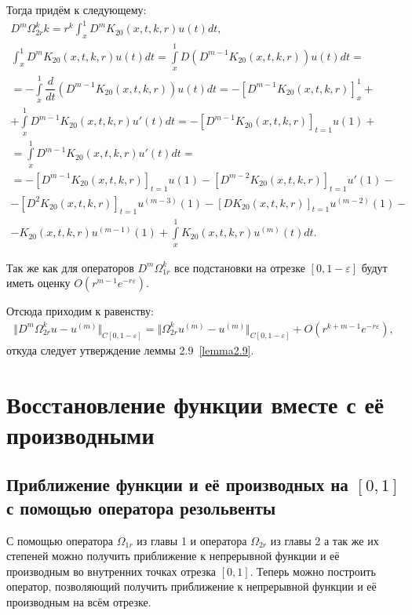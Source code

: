 Тогда придём к следующему:
\begin{equation}
\begin{array}{c}
\nonumber

D^m\Omega_{2r}^kk = r^k \int_x^1 D^m K_{20}(x,t,k,r)u(t)dt, \\
\int_x^1 D^mK_{20}(x,t,k,r)u(t)dt = \int\limits_x^1 D(D^{m-1}K_{20}(x,t,k,r))u(t)dt = \\
= - \int\limits_x^1 \dfrac{d}{dt}(D^{m-1}K_{20}(x,t,k,r))u(t)dt = - [D^{m-1}K_{20}(x,t,k,r)]_x^1 + \\ + \int\limits_x^1 D^{m-1}K_{20}(x,t,k,r)u'(t)dt = -[D^{m-1}K_{20}(x,t,k,r)]_{t=1}u(1) + \\ = \int\limits_x^1 D^{m-1}K_{20}(x,t,k,r)u'(t)dt = \\
= -[D^{m-1}K_{20}(x,t,k,r)]_{t=1}u(1) - [D^{m-2}K_{20}(x,t,k,r)]_{t=1}u'(1) - \\ - [D^2K_{20}(x,t,k,r)]_{t=1}u^{(m-3)}(1) - [DK_{20}(x,t,k,r)]_{t=1}u^{(m-2)}(1) - \\ - K_{20}(x,t,k,r)u^{(m-1)}(1) + \int\limits_x^1 K_{20}(x,t,k,r)u^{(m)}(t)dt.

\end{array}
\end{equation}

Так же как для операторов $ D^m\Omega_{1r}^k $ все подстановки на отрезке $ [0,1-\varepsilon] $ будут иметь оценку $ O(r^{m-1}e^{-r\varepsilon}) $.

Отсюда приходим к равенству:
\begin{equation}
\begin{array}{c}
\nonumber

\Vert D^m\Omega_{2r}^ku - u^{(m)} \Vert_{C[0,1-\varepsilon]} = \Vert \Omega_{2r}^ku^{(m)} - u^{(m)} \Vert_{C[0,1-\varepsilon]} + O(r^{k+m-1}e^{-r\varepsilon}),

\end{array}
\end{equation}
откуда следует утверждение леммы 2.9~\eqref{lemma2.9}.

\chapter{Восстановление функции вместе с её производными}
\section{Приближение функции и её производных на $ [0,1] $ с помощью оператора резольвенты}
С помощью оператора $ \Omega_{1r} $ из главы 1 и оператора $ \Omega_{2r} $ из главы 2 а так же их степеней можно получить приближение к непрерывной функции и её производным во внутренних точках отрезка $ [0,1] $. Теперь можно построить оператор, позволяющий получить приближение к непрерывной функции и её производным на всём отрезке.

